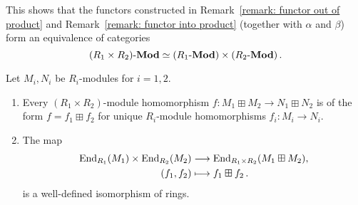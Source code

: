 \begin{remark}
  This shows that the functors constructed in Remark~\ref{remark: functor out of product} and Remark~\ref{remark: functor into product} (together with $\alpha$ and $\beta$) form an equivalence of categories
  \[
            (R_1 \times R_2)\text{-}\mathbf{Mod}
    \simeq  (R_1\text{-}\mathbf{Mod}) \times (R_2\text{-}\mathbf{Mod}) \,.
  \]
\end{remark}


\begin{corollary}
  \label{label: endomorphism ring of boxsum}
  Let $M_i, N_i$ be $R_i$-modules for $i = 1, 2$.
  \begin{enumerate}
    \item
      Every $(R_1 \times R_2)$-module homomorphism $f \colon M_1 \boxplus M_2 \to N_1 \boxplus N_2$ is of the form $f = f_1 \boxplus f_2$ for unique $R_i$-module homomorphisms $f_i \colon M_i \to N_i$.
    \item
      The map
      \begin{align*}
                  \operatorname{End}_{R_1}(M_1) \times \operatorname{End}_{R_2}(M_2)
        &\longrightarrow  \operatorname{End}_{R_1 \times R_2}(M_1 \boxplus M_2),
        \\
                      (f_1, f_2)
        &\longmapsto  f_1 \boxplus f_2 \,.
      \end{align*}
      is a well-defined isomorphism of rings.
  \end{enumerate}
\end{corollary}


